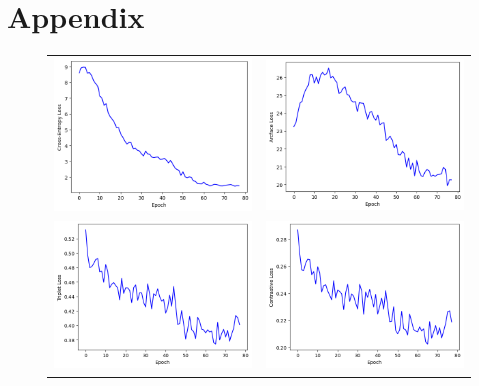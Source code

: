 \documentclass[10pt,twocolumn,letterpaper]{article}
\begin{document}
\section{Appendix}
\onecolumn
\begin{figure}[h!]
    \begin{tabular}{cc}
        \includegraphics[width=.5\textwidth]{../loss_imgs/ce.png}&\includegraphics[width=.5\textwidth]{../loss_imgs/arc.png}\\
        \includegraphics[width=.5\textwidth]{../loss_imgs/triplet.png}&\includegraphics[width=.5\textwidth]{../loss_imgs/cont.png}\\

\end{tabular}
\end{figure}
\end{document}

